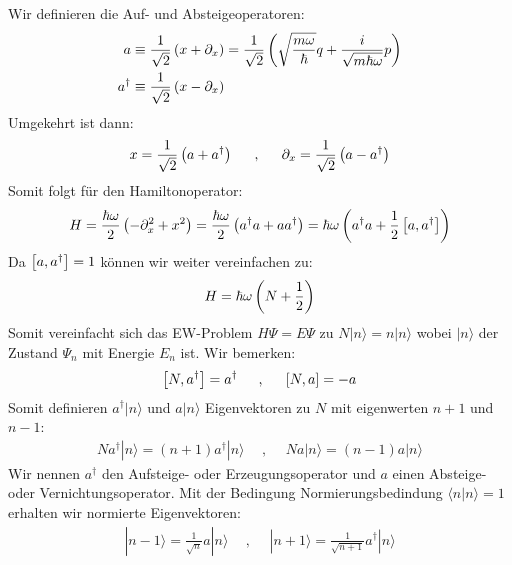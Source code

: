 Wir definieren die Auf- und Absteigeoperatoren:
\begin{align*}
    a &\equiv \frac{1}{\sqrt{2}} \left( x + \partial_x \right)
    = \frac{1}{\sqrt{2}} \left( \sqrt{\frac{m \omega}{\hbar}} q + \frac{i}{\sqrt{m \hbar \omega}} p \right)
    \\
    a^\dagger &\equiv \frac{1}{\sqrt{2}} \left( x - \partial_x \right)
\end{align*}
Umgekehrt ist dann:
\begin{align*}
    x = \frac{1}{\sqrt{2}} \left( a + a^\dagger \right)
    \hspace{15pt} , \hspace{15pt}
    \partial_x = \frac{1}{\sqrt{2}} \left( a - a^\dagger \right)
\end{align*}
Somit folgt für den Hamiltonoperator:
\begin{align*}
    H = \frac{\hbar \omega}{2} \left( - \partial_x^2 + x^2 \right)
    = \frac{\hbar \omega}{2} \left( a^\dagger a + a a^\dagger \right)
    = \hbar \omega \left( a^\dagger a + \frac{1}{2} \left[ a,a^\dagger \right] \right)
\end{align*}
Da $\left[ a,a^\dagger \right] = 1$ können wir weiter vereinfachen zu:
\begin{align*}
    H = \hbar \omega \left( N + \frac{1}{2} \right)
\end{align*}
Somit vereinfacht sich das EW-Problem $H \Psi = E \Psi$ zu $N |n\rangle = n |n\rangle$
wobei $|n\rangle$ der Zustand $\Psi_n$ mit Energie $E_n$ ist. Wir bemerken:
\begin{align*}
    \left[ N,a^\dagger \right] = a^\dagger
    \hspace{15pt} , \hspace{15pt}
    \left[ N,a \right] = -a
\end{align*}
Somit definieren $a^\dagger |n\rangle$ und $a|n\rangle$ Eigenvektoren zu $N$
mit eigenwerten $n+1$ und $n-1$:
\begin{align*}
    N a^\dagger |n\rangle = (n+1) a^\dagger |n\rangle
    \hspace{15pt} , \hspace{15pt}
    N a |n\rangle = (n-1) a |n\rangle
\end{align*}
Wir nennen $a^\dagger$ den Aufsteige- oder Erzeugungsoperator und $a$ einen
Absteige- oder Vernichtungsoperator. Mit der Bedingung Normierungsbedindung
$\langle n | n \rangle = 1$ erhalten wir normierte Eigenvektoren:
\begin{align*}
    |n-1\rangle = \frac{1}{\sqrt{n}} a |n\rangle
    \hspace{15pt} , \hspace{15pt}
    |n+1\rangle = \frac{1}{\sqrt{n+1}} a^\dagger |n\rangle
\end{align*}
